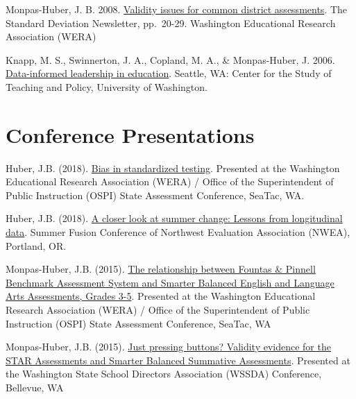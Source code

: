 \documentclass[
  letterpaper,
]{article}
\begin{document}
Monpas-Huber, J. B. 2008.
\href{https://drive.google.com/file/d/1e6rbcmWB8wU3L0KFt4FcoQsrmHbsOUiL/view?usp=sharing}{Validity
issues for common district assessments}. The Standard Deviation
Newsletter, pp.~20-29. Washington Educational Research Association
(WERA)

Knapp, M. S., Swinnerton, J. A., Copland, M. A., \& Monpas-Huber, J.
2006.
\href{http://www.education.uw.edu/ctp/sites/default/files/ctpmail/PDFs/DataInformed-Nov1.pdf}{Data-informed
leadership in education}. Seattle, WA: Center for the Study of Teaching
and Policy, University of Washington.

\section{Conference Presentations}\label{conference-presentations}

Huber, J.B. (2018).
\href{https://github.com/jackbhuber/talks/blob/9512d57d71405795fd703bb6844c7dd73e4968f0/2018_BiasInStandardizedTesting_WERA_120618.pdf}{Bias
in standardized testing}. Presented at the Washington Educational
Research Association (WERA) / Office of the Superintendent of Public
Instruction (OSPI) State Assessment Conference, SeaTac, WA.

Huber, J.B. (2018).
\href{https://github.com/jackbhuber/talks/blob/d03db8d2bd987d0b9ca05a0f5923347904a20a76/2018_ACloserLookAtSummerChange_Fusion_0618.pdf}{A
closer look at summer change: Lessons from longitudinal data}. Summer
Fusion Conference of Northwest Evaluation Association (NWEA), Portland,
OR.

Monpas-Huber, J.B. (2015).
\href{https://github.com/jackbhuber/talks/blob/bec125e98f93ee3e8e32f7f21ebe420bf97e8e80/2015_FB-SBA-Correlations_WERAPreconference_1215.pdf}{The
relationship between Fountas \& Pinnell Benchmark Assessment System and
Smarter Balanced English and Language Arts Assessments, Grades 3-5}.
Presented at the Washington Educational Research Association (WERA) /
Office of the Superintendent of Public Instruction (OSPI) State
Assessment Conference, SeaTac, WA

Monpas-Huber, J.B. (2015).
\href{https://github.com/jackbhuber/talks/blob/62ac1713b3f545576918ef33d045f11f6c03b392/2015_ValidityEvidenceforSTARSBAAssessment_WSSDAConference_112015.pdf}{Just
pressing buttons? Validity evidence for the STAR Assessments and Smarter
Balanced Summative Assessments}. Presented at the Washington State
School Directors Association (WSSDA) Conference, Bellevue, WA
\end{document}
